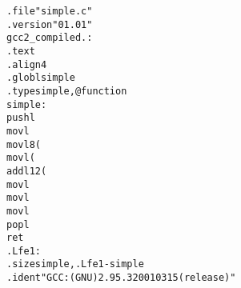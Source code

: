 \begin{alltt}
        .file   "simple.c"
        .version        "01.01"
gcc2_compiled.:
.text
        .align 4
.globl simple
        .type    simple,@function
simple:
        pushl %ebp
        movl %esp,%ebp
        movl 8(%ebp),%eax
        movl (%eax),%edx
        addl 12(%ebp),%edx
        movl %edx,(%eax)
        movl %edx,%eax
        movl %ebp,%esp
        popl %ebp
        ret
.Lfe1:
        .size    simple,.Lfe1-simple
        .ident  "GCC: (GNU) 2.95.3 20010315 (release)"
\end{alltt}
